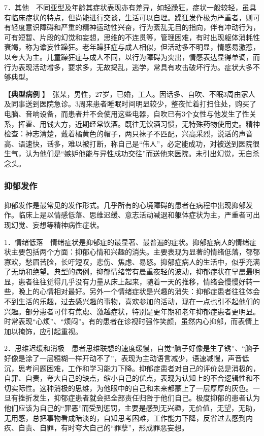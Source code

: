 7．其他　不同亚型及年龄其症状表现亦有差异，如轻躁狂，症状一般较轻，虽具有临床症状的特点，但尚能进行交谈，生活可以自理。躁狂发作极为严重者，则可有轻度意识障碍和严重的精神运动性兴奋，行为紊乱无目的指向，伴有冲动行为，可有短暂、片段的幻觉和妄想，思维的不连贯等，管理困难，有时出现躯体消耗性衰竭，称为谵妄性躁狂。老年躁狂症与成人相似，但活动多不明显，情感易激惹，以夸大为主。儿童躁狂症与成人不同，以行为障碍为突出，情感表达显得单调，而行为表现活动增多，要求多，无故捣乱，逃学，常具有攻击破坏行为。症状大多不够典型。

【\textbf{典型病例}
】　{张某，男性，27岁，已婚，工人。因话多、自吹、不眠3周由家人及同事送到医院急诊。3周来患者睡眠时间明显较少，整夜忙着打扫住处，购买了电脑、音响设备，而患者并不会使用这些电器，自吹已有3个女性与他发生了性关系，挥霍、用钱大方，近期经常饮酒。既往无饮酒习惯，无特殊药物使用史。精神检查：神志清楚，戴着橘黄色的帽子，两只袜子不匹配，兴高采烈，说话的声音高、语速快，话多，难以被打断，称自己是“伟人”，必定能成功，对被送到医院很生气，认为他们是“嫉妒他能与异性成功交往”而送他来医院。未引出幻觉，无自杀念头。}

\subsubsection{抑郁发作}

抑郁发作是最常见的发作形式。几乎所有的心境障碍的患者在病程中出现抑郁发作。临床上是以情感低落、思维迟缓、意志活动减退和躯体症状为主，严重者可出现幻觉、妄想等精神病性症状。

1．情绪低落　情绪症状是抑郁症的最显著、最普遍的症状。抑郁症病人的情绪症状主要包括两个方面：抑郁心情和兴趣的消失。主要表现为显著的情绪低落，郁郁寡欢，愁眉苦脸，长吁短叹，悲伤、焦虑、易怒。抑郁症病人的生活中，似乎充满了无助和绝望。典型的病例，抑郁情绪常有晨重夜轻的波动，抑郁症状在早晨最明显，患者往往觉得几乎没有力量从床上起来，随着一天的推移，情绪会慢慢好转一些，晚上的心情相对最好。另外一个情绪症状是兴趣的消失：抑郁症患者往往体会不到生活的乐趣，过去感兴趣的事物，喜欢参加的活动，现在一点也引不起他们的兴趣。部分患者可伴有焦虑、激越症状，特别是更年期和老年抑郁症患者更明显。时常表现“心烦”、“烦闷”。有的患者在诊视时强作笑颜，虽然内心抑郁，而表情上加以掩饰，应引起重视。

2．思维迟缓和消极　患者思维联想的速度缓慢，自觉“脑子好像是生了锈”、“脑子好像是涂了一层糨糊一样开动不了”，表现为主动语言减少，语速减慢，声音低沉，思考问题困难，工作和学习能力下降。抑郁症患者对自己的评价总是消极的，自罪、自责，夸大自己的缺点，缩小自己的优点，表现为认知上的不合逻辑性和不切实际性。这种消极的思维，为他眼中的自己和未来都蒙上了一层厚厚的灰色。一旦有挫折发生，抑郁症患者就会把全部责任归咎于他们自己。极度抑郁的患者认为他们应该为自己的“罪恶”而受到惩罚，主要是感到无兴趣，无价值，无望，无助，无用感，总把事物看成暗淡的，自知思考困难，工作能力下降，反省过去感到内疚、自责、自罪，有时夸大自己的“罪孽”，形成罪恶妄想。

